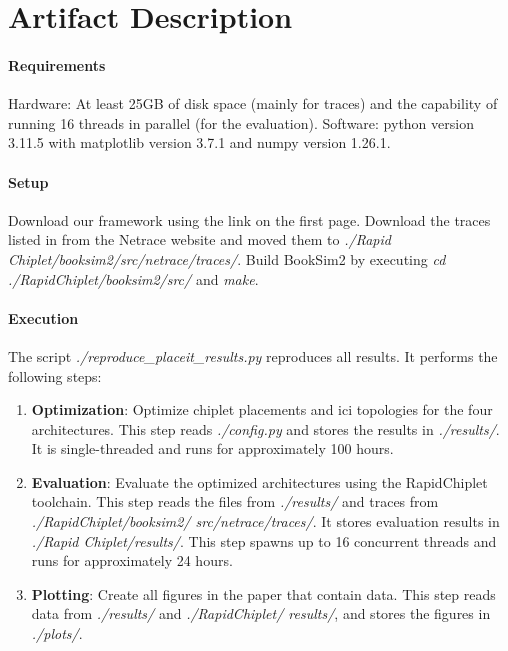 \section{Artifact Description}
\label{app:artifacts}

\paragraph{Requirements}
Hardware: At least 25GB of disk space (mainly for traces) and the capability of running 16 threads in parallel (for the evaluation).
Software: python version 3.11.5 with matplotlib version 3.7.1 and numpy version 1.26.1.

\paragraph{Setup}

Download our framework using the link on the first page.
Download the traces listed in  from the Netrace website \cite{netrace-traces} and moved them to \textit{./Rapid Chiplet/booksim2/src/netrace/traces/}.
Build BookSim2 by executing \textit{cd ./RapidChiplet/booksim2/src/} and \textit{make}.

\paragraph{Execution}

The script \textit{./reproduce\_placeit\_results.py} reproduces all results. It performs the following steps: 

\begin{enumerate}
	\item	\textbf{Optimization}: Optimize chiplet placements and \gls{ici} topologies for the four architectures. This step reads \textit{./config.py} and stores the results in \textit{./results/}. It is single-threaded and runs for approximately 100 hours.
	\item	\textbf{Evaluation}: Evaluate the optimized architectures using the RapidChiplet \cite{rapidchiplet} toolchain. This step reads the files from \textit{./results/} and traces from \textit{./RapidChiplet/booksim2/ src/netrace/traces/}. It stores evaluation results in \textit{./Rapid Chiplet/results/}. This step spawns up to 16 concurrent threads and runs for approximately 24 hours.
	\item	\textbf{Plotting}: Create all figures in the paper that contain data. This step reads data from \textit{./results/} and \textit{./RapidChiplet/ results/}, and stores the figures in \textit{./plots/}.
\end{enumerate}

